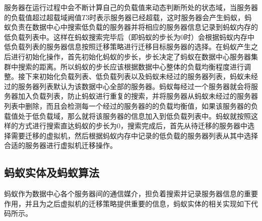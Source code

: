 服务器在运行过程中会不断计算自己的负载值来动态判断所处的状态域，当服务器的负载值超过超载域阙值$ T3 $时表示服务器已经超载，这时服务器会产生蚂蚁，蚂蚁负责在数据中心中搜索低负载的服务器并将相应的服务器信息记录到蚂蚁内存的低负载列表中。这样在蚂蚁搜索完毕后（即蚂蚁的步长为0时）会根据蚂蚁内存中低负载列表的服务器信息按照迁移策略进行迁移目标服务器的选择。在蚂蚁产生之后进行初始化操作，首先初始化蚂蚁的步长，步长决定了蚂蚁在数据中心服务器集群中搜索的距离。所以蚂蚁的步长应该根据数据中心整体的负载均衡程度进行调整。接下来初始化负载列表、低负载列表以及蚂蚁未经过的服务器列表，蚂蚁未经过的服务器列表默认为该数据中心全部的服务器。蚂蚁每经过一个服务器就会将服务器加入负载列表，防止蚂蚁进行重复的搜索，并将服务器从蚂蚁未经过的服务器列表中删除，而且会检测每一个经过的服务器的的负载均衡值，如果该服务器的负载值处于低负载域，那么就将该服务器的信息加入到低负载列表中。蚂蚁就按照这样的方式进行搜索直达蚂蚁的步长为0，搜索完成后，首先从待迁移的服务器中选择需要迁移的虚拟机，然后根据蚂蚁内存中记录的低负载的服务器列表从其中选择合适的服务器进行虚拟机迁移操作。

\subsection{蚂蚁实体及蚂蚁算法}
蚂蚁作为数据中心各个服务器间的通信媒介，担负着搜索并记录服务器信息的重要作用，并且为之后虚拟机的迁移策略提供重要的信息，蚂蚁实体的相关实现如下代码所示。

